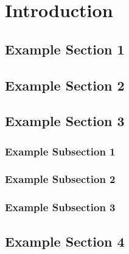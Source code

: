\documentclass[12pt,a4paper]{report}
\begin{document}
	
	
	
	
	
	
	
	


	\chapter{Introduction}


	\section{Example Section 1}
	\blindtext[2]
	\blindtext[2]
	\section{Example Section 2}
	\blindtext[5]
	\section{Example Section 3}
	\subsection{Example Subsection 1}
	\blindtext[5]
	\subsection{Example Subsection 2}
	\blindtext[5]
	\subsection{Example Subsection 3}
	\blindtext[5]
	\section{Example Section 4}
	\blindtext[5]
\end{document}
